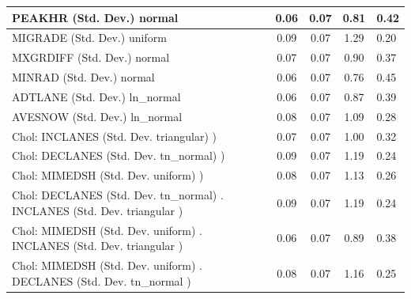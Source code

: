 \begin{table}
\begin{center}
\begin{tabular}{|l|l|c|c|c|l|}
			\hline
			PEAKHR (Std. Dev.) normal &  & 0.06 & 0.07 & 0.81 & 0.42 \\
			\hline
			MIGRADE (Std. Dev.) uniform &  & 0.09 & 0.07 & 1.29 & 0.20 \\
			\hline
			MXGRDIFF (Std. Dev.) normal &  & 0.07 & 0.07 & 0.90 & 0.37 \\
			\hline
			MINRAD (Std. Dev.) normal &  & 0.06 & 0.07 & 0.76 & 0.45 \\
			\hline
			ADTLANE (Std. Dev.) ln_normal &  & 0.06 & 0.07 & 0.87 & 0.39 \\
			\hline
			AVESNOW (Std. Dev.) ln_normal &  & 0.08 & 0.07 & 1.09 & 0.28 \\
			\hline
			 Chol: INCLANES (Std. Dev. triangular) ) &  & 0.07 & 0.07 & 1.00 & 0.32 \\
			\hline
			 Chol: DECLANES (Std. Dev. tn_normal) ) &  & 0.09 & 0.07 & 1.19 & 0.24 \\
			\hline
			 Chol: MIMEDSH (Std. Dev. uniform) ) &  & 0.08 & 0.07 & 1.13 & 0.26 \\
			\hline
			 Chol: DECLANES (Std. Dev. tn_normal) . INCLANES (Std. Dev.   triangular ) &  & 0.09 & 0.07 & 1.19 & 0.24 \\
			\hline
			 Chol: MIMEDSH (Std. Dev. uniform) . INCLANES (Std. Dev.   triangular ) &  & 0.06 & 0.07 & 0.89 & 0.38 \\
			\hline
			 Chol: MIMEDSH (Std. Dev. uniform) . DECLANES (Std. Dev.   tn_normal ) &  & 0.08 & 0.07 & 1.16 & 0.25 \\
			\hline
		\end{tabular}
	\end{center}
\end{table}
